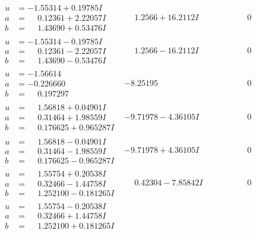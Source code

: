 \documentclass[1p]{elsarticle_modified}
\theoremstyle{definition}
\begin{document}
$$\begin{array}{c|c|c}
\begin{aligned}
u &= -1.55314 + 0.19785 I \\
a &= \phantom{-}0.12361 + 2.22057 I \\
b &= \phantom{-}1.43690 + 0.53476 I\end{aligned}
 & \phantom{-}1.2566 + 16.2112 I & \phantom{-0.000000 } 0 \\ \hline\begin{aligned}
u &= -1.55314 - 0.19785 I \\
a &= \phantom{-}0.12361 - 2.22057 I \\
b &= \phantom{-}1.43690 - 0.53476 I\end{aligned}
 & \phantom{-}1.2566 - 16.2112 I & \phantom{-0.000000 } 0 \\ \hline\begin{aligned}
u &= -1.56614\phantom{ +0.000000I} \\
a &= -0.226660\phantom{ +0.000000I} \\
b &= \phantom{-}0.197297\phantom{ +0.000000I}\end{aligned}
 & -8.25195\phantom{ +0.000000I} & \phantom{-0.000000 } 0 \\ \hline\begin{aligned}
u &= \phantom{-}1.56818 + 0.04901 I \\
a &= \phantom{-}0.31464 + 1.98559 I \\
b &= \phantom{-}0.176625 + 0.965287 I\end{aligned}
 & -9.71978 - 4.36105 I & \phantom{-0.000000 } 0 \\ \hline\begin{aligned}
u &= \phantom{-}1.56818 - 0.04901 I \\
a &= \phantom{-}0.31464 - 1.98559 I \\
b &= \phantom{-}0.176625 - 0.965287 I\end{aligned}
 & -9.71978 + 4.36105 I & \phantom{-0.000000 } 0 \\ \hline\begin{aligned}
u &= \phantom{-}1.55754 + 0.20538 I \\
a &= \phantom{-}0.32466 - 1.44758 I \\
b &= \phantom{-}1.252100 - 0.181265 I\end{aligned}
 & \phantom{-}0.42304 - 7.85842 I & \phantom{-0.000000 } 0 \\ \hline\begin{aligned}
u &= \phantom{-}1.55754 - 0.20538 I \\
a &= \phantom{-}0.32466 + 1.44758 I \\
b &= \phantom{-}1.252100 + 0.181265 I\end{aligned}

\end{array}$$
\end{document}
